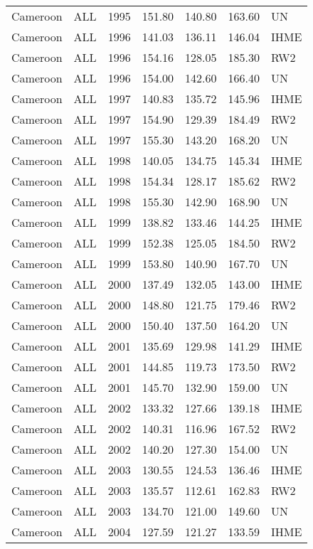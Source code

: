 \begin{longtable}{lllrrrl}
  Cameroon & ALL & 1995 & 151.80 & 140.80 & 163.60 & UN \\ 
  Cameroon & ALL & 1996 & 141.03 & 136.11 & 146.04 & IHME \\ 
  Cameroon & ALL & 1996 & 154.16 & 128.05 & 185.30 & RW2 \\ 
  Cameroon & ALL & 1996 & 154.00 & 142.60 & 166.40 & UN \\ 
  Cameroon & ALL & 1997 & 140.83 & 135.72 & 145.96 & IHME \\ 
  Cameroon & ALL & 1997 & 154.90 & 129.39 & 184.49 & RW2 \\ 
  Cameroon & ALL & 1997 & 155.30 & 143.20 & 168.20 & UN \\ 
  Cameroon & ALL & 1998 & 140.05 & 134.75 & 145.34 & IHME \\ 
  Cameroon & ALL & 1998 & 154.34 & 128.17 & 185.62 & RW2 \\ 
  Cameroon & ALL & 1998 & 155.30 & 142.90 & 168.90 & UN \\ 
  Cameroon & ALL & 1999 & 138.82 & 133.46 & 144.25 & IHME \\ 
  Cameroon & ALL & 1999 & 152.38 & 125.05 & 184.50 & RW2 \\ 
  Cameroon & ALL & 1999 & 153.80 & 140.90 & 167.70 & UN \\ 
  Cameroon & ALL & 2000 & 137.49 & 132.05 & 143.00 & IHME \\ 
  Cameroon & ALL & 2000 & 148.80 & 121.75 & 179.46 & RW2 \\ 
  Cameroon & ALL & 2000 & 150.40 & 137.50 & 164.20 & UN \\ 
  Cameroon & ALL & 2001 & 135.69 & 129.98 & 141.29 & IHME \\ 
  Cameroon & ALL & 2001 & 144.85 & 119.73 & 173.50 & RW2 \\ 
  Cameroon & ALL & 2001 & 145.70 & 132.90 & 159.00 & UN \\ 
  Cameroon & ALL & 2002 & 133.32 & 127.66 & 139.18 & IHME \\ 
  Cameroon & ALL & 2002 & 140.31 & 116.96 & 167.52 & RW2 \\ 
  Cameroon & ALL & 2002 & 140.20 & 127.30 & 154.00 & UN \\ 
  Cameroon & ALL & 2003 & 130.55 & 124.53 & 136.46 & IHME \\ 
  Cameroon & ALL & 2003 & 135.57 & 112.61 & 162.83 & RW2 \\ 
  Cameroon & ALL & 2003 & 134.70 & 121.00 & 149.60 & UN \\ 
  Cameroon & ALL & 2004 & 127.59 & 121.27 & 133.59 & IHME \\ 

\end{longtable}
